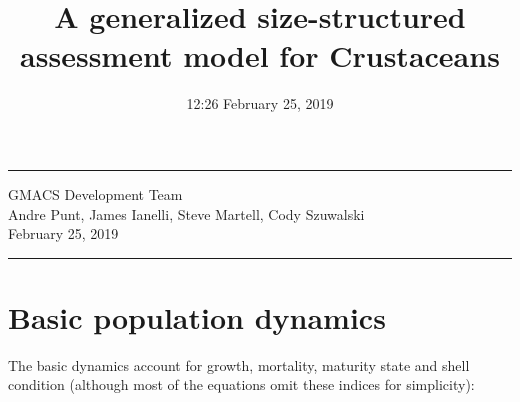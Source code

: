 \documentclass[]{article}
\title{A generalized size-structured assessment model for Crustaceans}
\author{}
\date{12:26 February 25, 2019}
\begin{document}
\maketitle

{
\setcounter{tocdepth}{2}
\tableofcontents
}

\begin{center}\rule{0.5\linewidth}{\linethickness}\end{center}

\begin{centering}
GMACS Development Team \\
  Andre Punt, James Ianelli, Steve Martell, Cody Szuwalski  
  \\
\fontsize{10}{12}
\selectfont
February 25, 2019 \\
\end{centering}

\begin{center}\rule{0.5\linewidth}{\linethickness}\end{center}

 \def\putEq{\setcounter{saveEq}{\value{equation}}}
\def\getEq{\setcounter{equation}{\value{saveEq}}}
\def\tableEq{ %
    \putEq \setcounter{equation}{0}
    \renewcommand{\theequation}{T\arabic{table}.\arabic{equation}}
    \vspace{-5mm}
    } \def\normalEq{ %
    \getEq
    \renewcommand{\theequation}{\arabic{section}.\arabic{equation}}}

\def\puthrule{ %
    \hrule \hrule \hrule \hrule \hrule}

\def\puthrule{ %
    \hrule \hrule \hrule \hrule \hrule}

\newcommand{\fspr}{$F_{\textnormal{SPR}}$}

\newcommand{\bspr}{$B_{\textnormal{SPR\%}}$}

\newcommand{\fmsy}{$F_{\textnormal{MSY}}$}
\newcommand{\bmsy}{$B_{\textnormal{MSY}}$}

\section{Basic population dynamics}\label{basic-population-dynamics}

The basic dynamics account for growth, mortality, maturity state and
shell condition (although most of the equations omit these indices for
simplicity):
\end{document}
